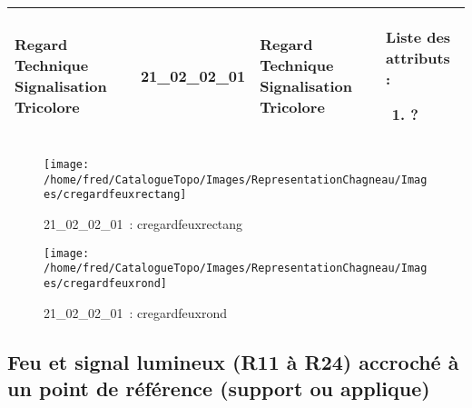 \documentclass[12pt,titlepage]{book}
\begin{document}
\renewcommand{\arraystretch}{1.2}
\begin{supertabular}{|p{10cm}|c|p{13cm}|p{12cm}|}
 Regard Technique Signalisation Tricolore & 21\_02\_02\_01 & Regard Technique Signalisation Tricolore & Liste des attributs :
\begin{enumerate}
  \item ?\end{enumerate}
\\
\hline
\end{supertabular}
\begin{figure}[h!]
  \hfill         %
  \begin{minipage}[t]{3cm}
    \begin{center}
      \texttt{[image: /home/fred/CatalogueTopo/Images/RepresentationChagneau/Images/cregardfeuxrectang]}
      \caption[~21\_02\_02\_01]{\small{21\_02\_02\_01~:} \tiny{cregardfeuxrectang}}\label{cregardfeuxrectang}
    \end{center}
  \end{minipage}
  \begin{minipage}[t]{3cm}
    \begin{center}
      \texttt{[image: /home/fred/CatalogueTopo/Images/RepresentationChagneau/Images/cregardfeuxrond]}
      \caption[~21\_02\_02\_01]{\small{21\_02\_02\_01~:} \tiny{cregardfeuxrond}}\label{cregardfeuxrond}
    \end{center}
  \end{minipage}
\end{figure}


\subsection{Feu et signal lumineux (R11 à R24) accroché à un point de référence (support ou applique)}
\noindent
\vspace{\baselineskip}
\end{document}
